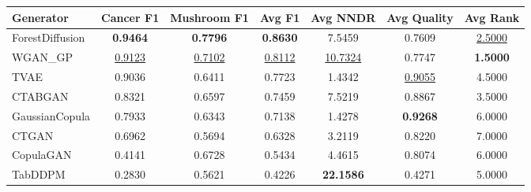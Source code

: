 \begin{tabular}{lcccccc}
\toprule
Generator & Cancer F1 & Mushroom F1 & Avg F1 & Avg NNDR & Avg Quality & Avg Rank \\
\midrule
ForestDiffusion & \textbf{0.9464} & \textbf{0.7796} & \textbf{0.8630} & 7.5459 & 0.7609 & \underline{2.5000} \\
WGAN_GP & \underline{0.9123} & \underline{0.7102} & \underline{0.8112} & \underline{10.7324} & 0.7747 & \textbf{1.5000} \\
TVAE & 0.9036 & 0.6411 & 0.7723 & 1.4342 & \underline{0.9055} & 4.5000 \\
CTABGAN & 0.8321 & 0.6597 & 0.7459 & 7.5219 & 0.8867 & 3.5000 \\
GaussianCopula & 0.7933 & 0.6343 & 0.7138 & 1.4278 & \textbf{0.9268} & 6.0000 \\
CTGAN & 0.6962 & 0.5694 & 0.6328 & 3.2119 & 0.8220 & 7.0000 \\
CopulaGAN & 0.4141 & 0.6728 & 0.5434 & 4.4615 & 0.8074 & 6.0000 \\
TabDDPM & 0.2830 & 0.5621 & 0.4226 & \textbf{22.1586} & 0.4271 & 5.0000 \\
\bottomrule
\end{tabular}
